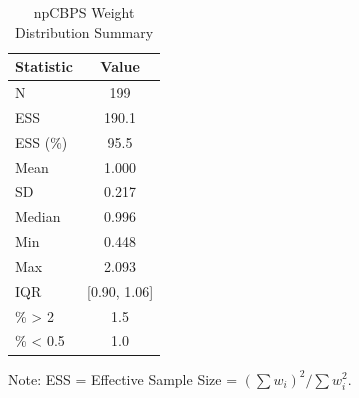 \begin{table}[htbp]
\centering
\caption{npCBPS Weight Distribution Summary}
\label{tab:weights}
\begin{tabular}{lc}
\toprule
Statistic & Value \\
\midrule
N & 199 \\
ESS & 190.1 \\
ESS (\%) & 95.5 \\
Mean & 1.000 \\
SD & 0.217 \\
Median & 0.996 \\
Min & 0.448 \\
Max & 2.093 \\
IQR & [0.90, 1.06] \\
\% > 2 & 1.5 \\
\% < 0.5 & 1.0 \\
\bottomrule
\end{tabular}
\begin{tablenotes}
\small
\item Note: ESS = Effective Sample Size = $(\sum w_i)^2 / \sum w_i^2$.
\end{tablenotes}
\end{table}
